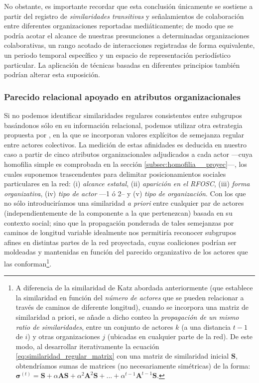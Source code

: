 \documentclass[letterpaper, 11pt]{book}
\theoremstyle{definition}
\theoremstyle{remark}
\begin{document}
No obstante, es importante recordar que esta conclusión únicamente se sostiene a partir del registro de \emph{similaridades transitivas} y señalamientos de colaboración entre diferentes organizaciones reportadas mediáticamente; de modo que se podría acotar el alcance de nuestras presunciones a determinadas organizaciones colaborativas, un rango acotado de interacciones registradas de forma equivalente, un periodo temporal específico y un espacio de representación periodístico particular. 
La aplicación de técnicas basadas en diferentes principios también podrían alterar esta suposición. 



\subsubsection{Parecido relacional apoyado en atributos organizacionales}
\label{subsubsection:similaridadRegRedAttr__proyec}

Si no podemos identificar similaridades regulares consistentes entre subgrupos basándonos sólo en su información relacional, podemos utilizar otra estrategia propuesta por \citet{2010_Newman_Networks}, en la que se incorporan valores explícitos de semejanza regular entre actores colectivos. 
La medición de estas afinidades es deducida en nuestro caso a partir de cinco atributos organizacionales adjudicados a cada actor ---cuya homofilia simple es comprobada en la sección \ref{subsec:homofilia__proyec}---, los cuales suponemos trascendentes para delimitar posicionamientos sociales particulares en la red: (i) \emph{alcance estatal}, (ii) \emph{aparición en el RFOSC}, (iii) \emph{forma organizativa}, (iv) \emph{tipo de actor} ---1 ó 2-- y (v) \emph{tipo de organización}.  
Con los que no sólo introduciríamos una similaridad \emph{a priori} entre cualquier par de actores (independientemente de la componente a la que pertenezcan) basada en su contexto social; sino que la propagación ponderada de tales semejanzas por caminos de longitud variable idealmente nos permitiría reconocer subgrupos afines en distintas partes de la red proyectada, cuyas coaliciones podrían ser moldeadas y mantenidas en función del parecido organizativo de los actores que las conforman\footnote{
    A diferencia de la similaridad de Katz abordada anteriormente (que establece la similaridad en función del \emph{número de actores} que se pueden relacionar a través de caminos de diferente longitud), cuando se incorpora una matriz de similaridad a priori, se añade a dicho conteo la \emph{propagación de un mismo ratio de similaridades}, entre un conjunto de actores $k$ (a una distancia $t-1$ de $i$) y otras organizaciones $j$ (ubicadas en cualquier parte de la red). 
    De este modo, al desarrollar iterativamente la ecuación \ref{eq:similaridad_regular_matrix} con una matriz de similaridad inicial $\mathbf{S}$, obtendríamos sumas de matrices (no necesariamente simétricas) de la forma: 
    $\mathbf{\sigma}^{(t)} = \mathbf{S} + \alpha \mathbf{A}\mathbf{S} + \alpha^{2} \mathbf{A}^{2}\mathbf{S} + ... + \alpha^{t-1} \mathbf{A}^{t-1}\mathbf{S}$. 
}. 
\end{document}
